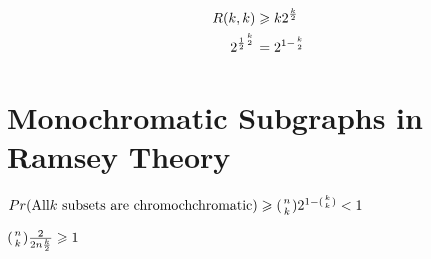 \[
\begin{aligned}
R(k, k) & \geq k2^{\frac{k}{2}} \\
2^{\frac{1}{2}^{k \atop 2}} & = 2^{1 - {k \atop 2}}
\end{aligned}
\]


\section*{Monochromatic Subgraphs in Ramsey Theory}

$Pr(\text{All} k \text{ subsets are chromochchromatic}) \geq ( {n \atop k} )2^{1-({k \atop k})} < 1$

$({n \atop k})\frac{2}{2 {n \frac{k}{2}}} \geq 1$


